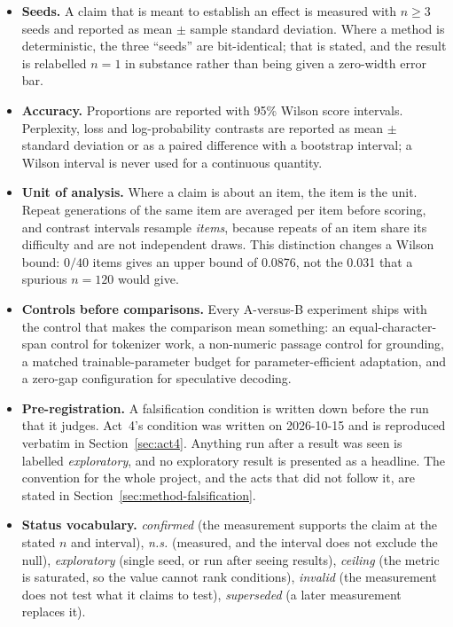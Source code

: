 \documentclass[11pt,a4paper]{article}
\begin{document}
\begin{itemize}
\item \textbf{Seeds.} A claim that is meant to establish an effect is measured
      with $n \geq 3$ seeds and reported as mean $\pm$ sample standard
      deviation. Where a method is deterministic, the three ``seeds'' are
      bit-identical; that is stated, and the result is relabelled $n=1$ in
      substance rather than being given a zero-width error bar.
\item \textbf{Accuracy.} Proportions are reported with 95\% Wilson score
      intervals. Perplexity, loss and log-probability contrasts are reported as
      mean $\pm$ standard deviation or as a paired difference with a bootstrap
      interval; a Wilson interval is never used for a continuous quantity.
\item \textbf{Unit of analysis.} Where a claim is about an item, the item is
      the unit. Repeat generations of the same item are averaged per item
      before scoring, and contrast intervals resample \emph{items}, because
      repeats of an item share its difficulty and are not independent draws.
      This distinction changes a Wilson bound: $0/40$ items gives an upper
      bound of 0.0876, not the 0.031 that a spurious $n = 120$ would give.
\item \textbf{Controls before comparisons.} Every A-versus-B experiment ships
      with the control that makes the comparison mean something: an
      equal-character-span control for tokenizer work, a non-numeric passage
      control for grounding, a matched trainable-parameter budget for
      parameter-efficient adaptation, and a zero-gap configuration for
      speculative decoding.
\item \textbf{Pre-registration.} A falsification condition is written down
      before the run that it judges. Act~4's condition was written on
      2026-10-15 and is reproduced verbatim in Section~\ref{sec:act4}. Anything
      run after a result was seen is labelled \emph{exploratory}, and no
      exploratory result is presented as a headline. The convention for the
      whole project, and the acts that did not follow it, are stated in
      Section~\ref{sec:method-falsification}.
\item \textbf{Status vocabulary.} \emph{confirmed} (the measurement supports
      the claim at the stated $n$ and interval), \emph{n.s.} (measured, and the
      interval does not exclude the null), \emph{exploratory} (single seed, or
      run after seeing results), \emph{ceiling} (the metric is saturated, so the
      value cannot rank conditions), \emph{invalid} (the measurement does not
      test what it claims to test), \emph{superseded} (a later measurement
      replaces it).
\end{itemize}
\end{document}
